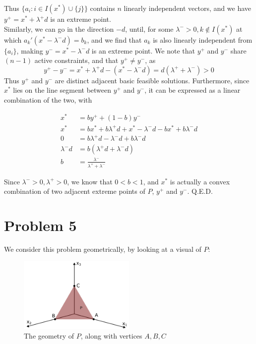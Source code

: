 \documentclass[11pt]{article}
\begin{document}
Thus $\{a_i: i\in I(x^*)\cup\{j\}\}$ contains $n$ linearly independent vectors, and we have $y^+=x^*+\lambda^+ d$ is an extreme point.\\

Similarly, we can go in the direction $-d$, until, for some $\lambda^-> 0, k\notin I(x^*)$ at which $a_k'(x^*-\lambda^-d)=b_k$, and we find that $a_k$ is also linearly independent from $\{a_i\}$, making  $y^-=x^*-\lambda^- d$ is an extreme point. We note that $y^+$ and $y^-$ share $(n-1)$ active constraints, and that $y^+\neq y^-$, as
$$
y^+-y^-=x^*+\lambda^+ d - (x^*-\lambda^- d) = d(\lambda^++\lambda^-)>0
$$
Thus $y^+$ and $y^-$ are distinct adjacent basic feasible solutions. Furthermore, since $x^*$ lies on the line segment between $y^+$ and $y^-$, it can be expressed as a linear combination of the two, with

\begin{equation}
\begin{split}
x^* &= by^+ + (1-b)y^-\\
x^* &= bx^* + b\lambda^+d + x^* - \lambda^-d - bx^* + b\lambda^-d\\
0 &= b\lambda^+d - \lambda^-d + b\lambda^-d\\
\lambda^-d &= b(\lambda^+d+\lambda^-d)\\
b&=\frac{\lambda^-}{\lambda^+ + \lambda^-}
\end{split}
\end{equation}

Since $\lambda^->0, \lambda^+>0$, we know that $0<b<1$, and $x^*$ is actually a convex combination of two adjacent extreme points of $P$, $y^+$ and $y^-$. Q.E.D.

\section*{Problem 5}

We consider this problem geometrically, by looking at a visual of $P$:

\begin{figure}[h]
\includegraphics[width=0.5\textwidth]{5_geometry}
\centering
\caption{The geometry of $P$, along with vertices $A, B, C$}
\end{figure}
\end{document}
